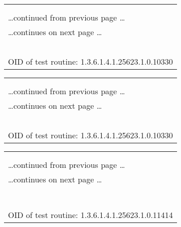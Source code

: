 \documentclass{article}
\begin{document}
\begin{longtable}{|p{}|}
\hline
\rowcolor{openvas_log}{\color{white}{Log (CVSS: 0.0) }}\\
\rowcolor{openvas_log}{\color{white}{NVT: Services}}\\
\hline
\endfirsthead
\hfill\ldots continued from previous page \ldots \\
\hline
\endhead
\hline
\ldots continues on next page \ldots \\
\endfoot
\hline
\endlastfoot
\\
\rowcolor{white}{\verb=A TLSv1 server answered on this port=}\\
\rowcolor{white}{\verb==}\\
\rowcolor{white}{\verb==}\\
\\
OID of test routine: 1.3.6.1.4.1.25623.1.0.10330\\
\end{longtable}

\begin{longtable}{|p{}|}
\hline
\rowcolor{openvas_log}{\color{white}{Log (CVSS: 0.0) }}\\
\rowcolor{openvas_log}{\color{white}{NVT: Services}}\\
\hline
\endfirsthead
\hfill\ldots continued from previous page \ldots \\
\hline
\endhead
\hline
\ldots continues on next page \ldots \\
\endfoot
\hline
\endlastfoot
\\
\rowcolor{white}{\verb=An IMAP server is running on this port through SSL=}\\
\rowcolor{white}{\verb==}\\
\rowcolor{white}{\verb==}\\
\\
OID of test routine: 1.3.6.1.4.1.25623.1.0.10330\\
\end{longtable}

\begin{longtable}{|p{}|}
\hline
\rowcolor{openvas_log}{\color{white}{Log (CVSS: 0.0) }}\\
\rowcolor{openvas_log}{\color{white}{NVT: IMAP Banner}}\\
\hline
\endfirsthead
\hfill\ldots continued from previous page \ldots \\
\hline
\endhead
\hline
\ldots continues on next page \ldots \\
\endfoot
\hline
\endlastfoot
\\
\rowcolor{white}{\verb=The remote imap server banner is :=}\\
\rowcolor{white}{\verb=* OK [CAPABILITY IMAP4rev1 LITERAL+ SASL-IR LOGIN-REFERRALS ID ENABLE AUTH=\verb-=-\verb=PLAIN=}\\
\rowcolor{white}{$\hookrightarrow$\verb=] Dovecot ready. =}\\
\rowcolor{white}{\verb==}\\
\rowcolor{white}{\verb==}\\
\\
OID of test routine: 1.3.6.1.4.1.25623.1.0.11414\\
\end{longtable}
\end{document}
